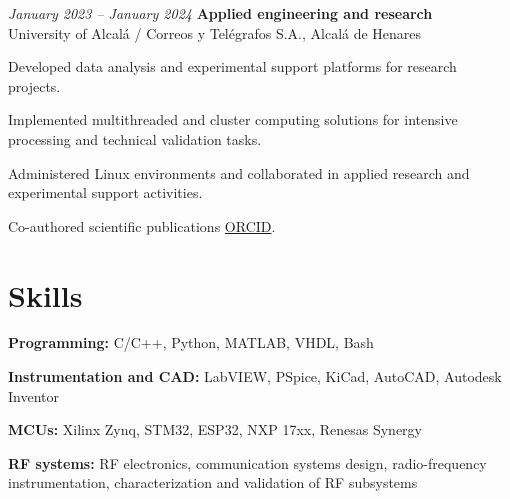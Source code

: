 \begin{twocolentry}{\textit{January 2023 – January 2024}}
	\textbf{Applied engineering and research} \\
	University of Alcalá / Correos y Telégrafos S.A., Alcalá de Henares
\end{twocolentry}
\begin{onecolentry}
	\begin{highlights}
		\item Developed data analysis and experimental support platforms for research projects.
		\item Implemented multithreaded and cluster computing solutions for intensive processing and technical validation tasks.
		\item Administered Linux environments and collaborated in applied research and experimental support activities.
		\item Co-authored scientific publications \href{https://orcid.org/0009-0000-6862-1872}{ORCID}.
	\end{highlights}
\end{onecolentry}

\vspace{-7pt}

\section{Skills}

\begin{onecolentry}
	\textbf{Programming:} C/C++, Python, MATLAB, VHDL, Bash
\end{onecolentry}
\begin{onecolentry}
	\textbf{Instrumentation and CAD:} LabVIEW, PSpice, KiCad, AutoCAD, Autodesk Inventor
\end{onecolentry}
\begin{onecolentry}
	\textbf{MCUs:} Xilinx Zynq, STM32, ESP32, NXP 17xx, Renesas Synergy
\end{onecolentry}
\begin{onecolentry}
	\textbf{RF systems:} RF electronics, communication systems design, radio-frequency instrumentation, characterization and validation of RF subsystems
\end{onecolentry}